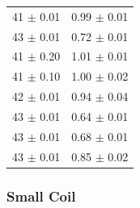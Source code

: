 \documentclass[a4paper]{article}
\begin{document}
\begin{table}[H]
\begin{center}
\begin{tabular}{|l|l|}
      41 \( \pm \) 0.01 & 0.99  \( \pm \) 0.01 \\
      43 \( \pm \) 0.01 & 0.72  \( \pm \) 0.01 \\
      41 \( \pm \) 0.20 & 1.01  \( \pm \) 0.01 \\
      41 \( \pm \) 0.10 & 1.00  \( \pm \) 0.02 \\
      42 \( \pm \) 0.01 & 0.94  \( \pm \) 0.04 \\
      43 \( \pm \) 0.01 & 0.64  \( \pm \) 0.01 \\
      43 \( \pm \) 0.01 & 0.68  \( \pm \) 0.01 \\
      43 \( \pm \) 0.01 & 0.85  \( \pm \) 0.02 \\
      \hline
    \end{tabular}
  \end{center}
  \label{tab:freqVolt}
\end{table}

\subsubsection{Small Coil}
\end{document}
